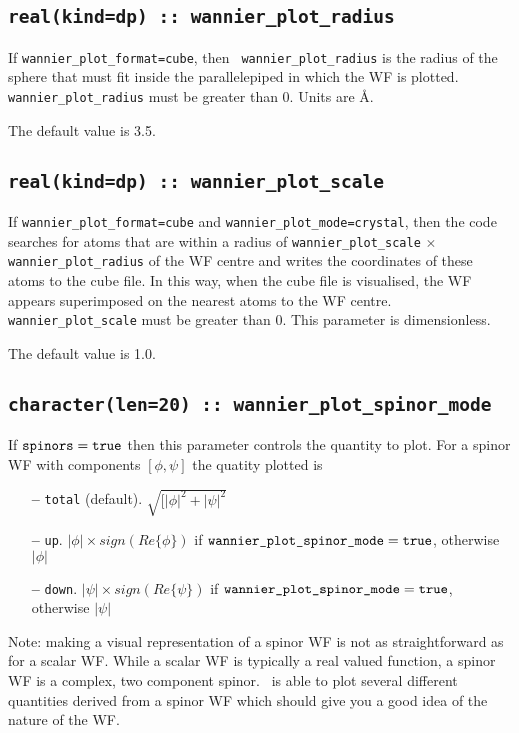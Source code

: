 \subsection[wannier\_plot\_radius]{\tt real(kind=dp) ::
  wannier\_plot\_radius}

If {\tt wannier\_plot\_format=cube}, then {\tt
  wannier\_plot\_radius} is the radius of the sphere that must fit inside the parallelepiped in which the WF is plotted. {\tt wannier\_plot\_radius} must be greater than
  0. Units are \AA.

The default value is 3.5.

\subsection[wannier\_plot\_scale]{\tt real(kind=dp) ::
  wannier\_plot\_scale}
If {\tt wannier\_plot\_format=cube} and {\tt wannier\_plot\_mode=crystal}, then the code searches for atoms that are within a radius
of {\tt wannier\_plot\_scale} $\times$ {\tt wannier\_plot\_radius} of the WF centre and writes the coordinates of these atoms to the cube file.
In this way, when the cube file is visualised, the WF appears superimposed on the nearest atoms to the WF centre. {\tt wannier\_plot\_scale} must
be greater than 0. This parameter is dimensionless.

The default value is 1.0.

\subsection[wannier\_plot\_spinor\_mode]{\tt character(len=20) :: wannier\_plot\_spinor\_mode}
If $\verb#spinors#=\verb#true#$ then this parameter controls the
quantity to plot. For a spinor WF with components $[\phi,\psi]$ the quatity plotted is
\begin{itemize}
\item[{\bf --}] \verb#total# (default). $\sqrt{[|\phi|^2+|\psi|^2}$
\item[{\bf --}] \verb#up#. $|\phi|\times sign(Re\{\phi\})$ if $\verb#wannier_plot_spinor_mode#=\verb#true#$,
 otherwise $|\phi|$
\item[{\bf --}] \verb#down#. $|\psi|\times sign(Re\{\psi\})$ if
  $\verb#wannier_plot_spinor_mode#=\verb#true#$, otherwise $|\psi|$
\end{itemize}
Note: making a visual representation of a spinor WF is not as
straightforward as for a scalar WF. While  a scalar WF is typically a
real valued function, a spinor WF is a complex, two component
spinor. \wannier\ is able to plot several different quantities derived
from a spinor WF which should give you a good idea of the nature of
the WF.

